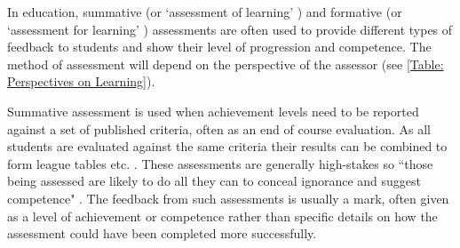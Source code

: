 In education, summative (or `assessment of learning' \citep{digiassess}) and formative (or `assessment for learning' \citep{digiassess}) assessments are often used to provide different types of feedback to students and show their level of progression and competence. The method of assessment will depend on the perspective of the assessor (see \autoref{Table: Perspectives on Learning}).

Summative assessment is used when achievement levels need to be reported against a set of published criteria, often as an end of course evaluation. As all students are evaluated against the same criteria their results can be combined to form league tables etc. \citep{assessmentTypes}. These assessments are generally high-stakes so ``those being assessed are likely to do all they can to conceal ignorance and suggest competence" \citep{knight2001briefing}. The feedback from such assessments is usually a mark, often given as a level of achievement or competence rather than specific details on how the assessment could have been completed more successfully.


